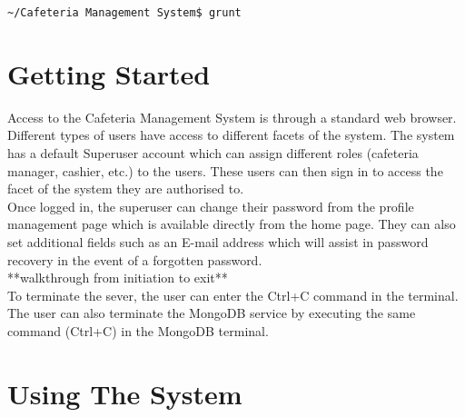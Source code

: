 \documentclass[12pt]{article}
\begin{document}
\begin{verbatim}
~/Cafeteria Management System$ grunt
\end{verbatim}


\section{Getting Started}
Access to the Cafeteria Management System is through a standard web browser. Different types of users have access to different facets of the system. The system has a default Superuser account which can assign different roles (cafeteria manager, cashier, etc.) to the users. These users can then sign in to access the facet of the system they are authorised to.\\
Once logged in, the superuser can change their password from the profile management page which is available directly from the home page. They can also set additional fields such as an E-mail address which will assist in password recovery in the event of a forgotten password.\\
**walkthrough from initiation to exit**\\
To terminate the sever, the user can enter the Ctrl+C command in the terminal. The user can also terminate the MongoDB service by executing the same command (Ctrl+C) in the MongoDB terminal.

\section{Using The System} 
\end{document}
